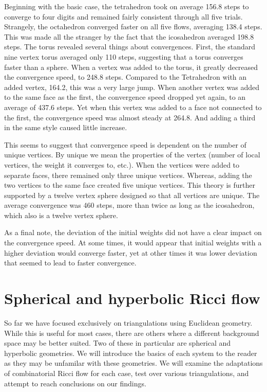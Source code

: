 \documentclass[12pt]{article}
\begin{document}
\noindent Beginning with the basic case, the tetrahedron took on average 156.8 steps to converge to four digits and remained fairly consistent through all five trials. Strangely, the octahedron converged faster on all five flows, averaging 138.4 steps. This was made all the stranger by the fact that the icosahedron averaged 198.8 steps. The torus revealed several things about convergences. First, the standard nine vertex torus averaged only 110 steps, suggesting that a torus converges faster than a sphere. When a vertex was added to the torus, it greatly decreased the convergence speed, to 248.8 steps. Compared to the Tetrahedron with an added vertex, 164.2, this was a very large jump. When another vertex was added to the same face as the first, the convergence speed dropped yet again, to an average of 437.6 steps. Yet when this vertex was added to a face not connected to the first, the convergence speed was almost steady at 264.8. And adding a third in the same style caused little increase.\newline

\noindent This seems to suggest that convergence speed is dependent on the number of unique vertices. By unique we mean the properties of the vertex (number of local vertices, the weight it converges to, etc.). When the vertices were added to separate faces, there remained only three unique vertices. Whereas, adding the two vertices to the same face created five unique vertices. This theory is further supported by a twelve vertex sphere designed so that all vertices are unique. The average convergence was 460 steps, more than twice as long as the icosahedron, which also is a twelve vertex sphere.\newline

\noindent As a final note, the deviation of the initial weights did not have a clear impact on the convergence speed. At some times, it would appear that initial weights with a higher deviation would converge faster, yet at other times it was lower deviation that seemed to lead to faster convergence.

\section{Spherical and hyperbolic Ricci flow}
\label{HypSphere}

So far we have focused exclusively on triangulations using Euclidean geometry. While this is useful for most cases, there are others where a different background space may be better suited. Two of these in particular are spherical and hyperbolic geometries. We will introduce the basics of each system to the reader as they may be unfamilar with these geometries. We will examine the adaptations of combinatorial Ricci flow for each case, test over various triangulations, and attempt to reach conclusions on our findings. 
\end{document}
